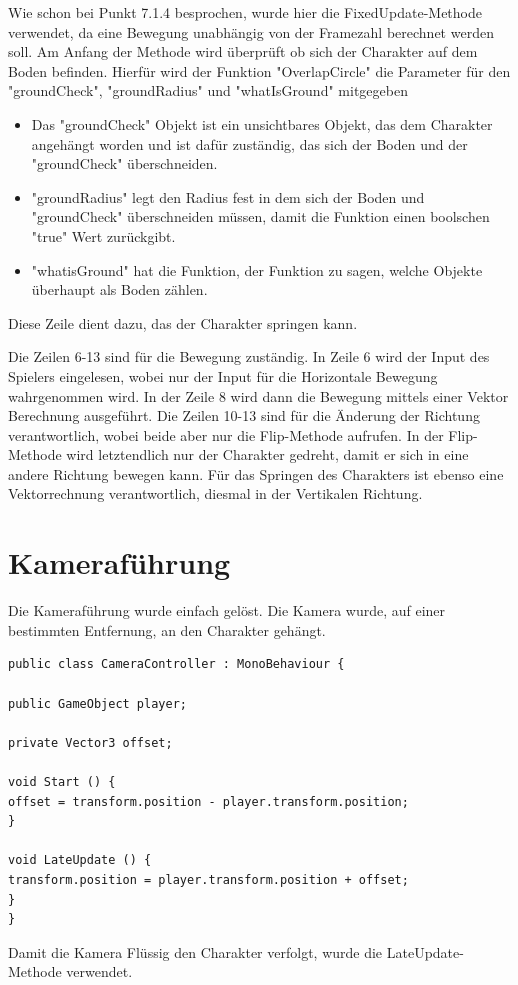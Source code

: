 Wie schon bei Punkt 7.1.4 besprochen, wurde hier die FixedUpdate-Methode verwendet, da eine Bewegung unabhängig von der Framezahl berechnet werden soll. Am Anfang der Methode wird überprüft ob sich der Charakter auf dem Boden befinden. Hierfür wird der Funktion "OverlapCircle" die Parameter für den "groundCheck", "groundRadius" und "whatIsGround" mitgegeben
\begin{itemize}
	\item Das "groundCheck" Objekt ist ein unsichtbares Objekt, das dem Charakter angehängt worden und ist dafür zuständig, das sich der Boden und der "groundCheck" überschneiden.
	\item "groundRadius" legt den Radius fest in dem sich der Boden und "groundCheck" überschneiden müssen, damit die Funktion einen boolschen "true" Wert zurückgibt.
	\item "whatisGround" hat die Funktion, der Funktion zu sagen, welche Objekte überhaupt als Boden zählen.
\end{itemize}
Diese Zeile dient dazu, das der Charakter springen kann.

Die Zeilen 6-13  sind für die Bewegung zuständig. In Zeile 6 wird der Input des Spielers eingelesen, wobei nur der Input für die Horizontale Bewegung wahrgenommen wird.
In der Zeile 8 wird dann die Bewegung mittels einer Vektor Berechnung ausgeführt.
Die Zeilen 10-13 sind für die Änderung der Richtung verantwortlich, wobei beide aber nur die Flip-Methode aufrufen. In der Flip-Methode wird letztendlich nur der Charakter gedreht, damit er sich in eine andere Richtung bewegen kann.
Für das Springen des Charakters ist ebenso eine Vektorrechnung verantwortlich, diesmal in der Vertikalen Richtung.

\section{Kameraführung}
Die Kameraführung wurde einfach gelöst. Die Kamera wurde, auf einer bestimmten Entfernung, an den Charakter gehängt. 

\begin{lstlisting}[language={[Sharp]C}, caption=Camera-Script]
public class CameraController : MonoBehaviour {

public GameObject player;

private Vector3 offset;

void Start () {
offset = transform.position - player.transform.position;
}

void LateUpdate () {
transform.position = player.transform.position + offset;
}
}
\end{lstlisting}
Damit die Kamera Flüssig den Charakter verfolgt, wurde die LateUpdate-Methode verwendet.

